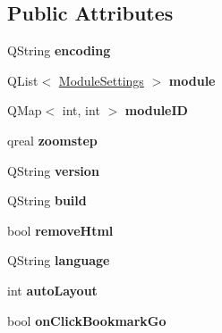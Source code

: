 \subsection*{Public Attributes}
\begin{CompactItemize}
\item 
\hypertarget{classSettings_4ec7fb59020b63a6a5a8a9d7d671a0b0}{
QString \textbf{encoding}}
\label{classSettings_4ec7fb59020b63a6a5a8a9d7d671a0b0}

\item 
\hypertarget{classSettings_5a50c0bb1e4c8fd7eea5667912414762}{
QList$<$ \hyperlink{classModuleSettings}{ModuleSettings} $>$ \textbf{module}}
\label{classSettings_5a50c0bb1e4c8fd7eea5667912414762}

\item 
\hypertarget{classSettings_e79e8c9e67743a86d5c507b519f75374}{
QMap$<$ int, int $>$ \textbf{moduleID}}
\label{classSettings_e79e8c9e67743a86d5c507b519f75374}

\item 
\hypertarget{classSettings_793c97945b015742072000590de3e6c6}{
qreal \textbf{zoomstep}}
\label{classSettings_793c97945b015742072000590de3e6c6}

\item 
\hypertarget{classSettings_3ab3d273b2d6322505e34c68e0016b6a}{
QString \textbf{version}}
\label{classSettings_3ab3d273b2d6322505e34c68e0016b6a}

\item 
\hypertarget{classSettings_222eb7c84467895c9e993b18a1b8d8ab}{
QString \textbf{build}}
\label{classSettings_222eb7c84467895c9e993b18a1b8d8ab}

\item 
\hypertarget{classSettings_fddb5ba4035ec3a19219377f12002b88}{
bool \textbf{removeHtml}}
\label{classSettings_fddb5ba4035ec3a19219377f12002b88}

\item 
\hypertarget{classSettings_efee23aee761eebf1fff9a391841b4a3}{
QString \textbf{language}}
\label{classSettings_efee23aee761eebf1fff9a391841b4a3}

\item 
\hypertarget{classSettings_e0fa8315ac34a140366b405780e272c3}{
int \textbf{autoLayout}}
\label{classSettings_e0fa8315ac34a140366b405780e272c3}

\item 
\hypertarget{classSettings_79f64a39105cf6f63eb8e54a64b19e83}{
bool \textbf{onClickBookmarkGo}}
\label{classSettings_79f64a39105cf6f63eb8e54a64b19e83}


\end{CompactItemize}
